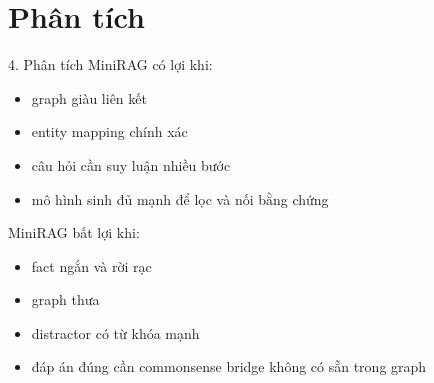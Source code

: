 \documentclass[11pt]{beamer}
\begin{document}
\section{Phân tích}

\begin{frame}{4. Phân tích}
MiniRAG có lợi khi:
\begin{itemize}
    \item graph giàu liên kết
    \item entity mapping chính xác
    \item câu hỏi cần suy luận nhiều bước
    \item mô hình sinh đủ mạnh để lọc và nối bằng chứng
\end{itemize}

MiniRAG bất lợi khi:
\begin{itemize}
    \item fact ngắn và rời rạc
    \item graph thưa
    \item distractor có từ khóa mạnh
    \item đáp án đúng cần commonsense bridge không có sẵn trong graph
\end{itemize}

\end{frame}
\end{document}
